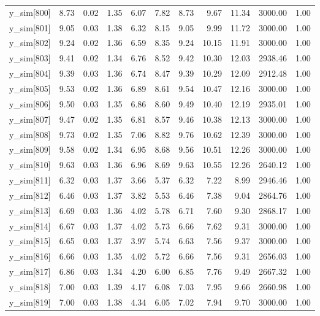 \begin{table}[ht]
\begin{tabular}{rrrrrrrrrrr}
  y\_sim[800] & 8.73 & 0.02 & 1.35 & 6.07 & 7.82 & 8.73 & 9.67 & 11.34 & 3000.00 & 1.00 \\ 
  y\_sim[801] & 9.05 & 0.03 & 1.38 & 6.32 & 8.15 & 9.05 & 9.99 & 11.72 & 3000.00 & 1.00 \\ 
  y\_sim[802] & 9.24 & 0.02 & 1.36 & 6.59 & 8.35 & 9.24 & 10.15 & 11.91 & 3000.00 & 1.00 \\ 
  y\_sim[803] & 9.41 & 0.02 & 1.34 & 6.76 & 8.52 & 9.42 & 10.30 & 12.03 & 2938.46 & 1.00 \\ 
  y\_sim[804] & 9.39 & 0.03 & 1.36 & 6.74 & 8.47 & 9.39 & 10.29 & 12.09 & 2912.48 & 1.00 \\ 
  y\_sim[805] & 9.53 & 0.02 & 1.36 & 6.89 & 8.61 & 9.54 & 10.47 & 12.16 & 3000.00 & 1.00 \\ 
  y\_sim[806] & 9.50 & 0.03 & 1.35 & 6.86 & 8.60 & 9.49 & 10.40 & 12.19 & 2935.01 & 1.00 \\ 
  y\_sim[807] & 9.47 & 0.02 & 1.35 & 6.81 & 8.57 & 9.46 & 10.38 & 12.13 & 3000.00 & 1.00 \\ 
  y\_sim[808] & 9.73 & 0.02 & 1.35 & 7.06 & 8.82 & 9.76 & 10.62 & 12.39 & 3000.00 & 1.00 \\ 
  y\_sim[809] & 9.58 & 0.02 & 1.34 & 6.95 & 8.68 & 9.56 & 10.51 & 12.26 & 3000.00 & 1.00 \\ 
  y\_sim[810] & 9.63 & 0.03 & 1.36 & 6.96 & 8.69 & 9.63 & 10.55 & 12.26 & 2640.12 & 1.00 \\ 
  y\_sim[811] & 6.32 & 0.03 & 1.37 & 3.66 & 5.37 & 6.32 & 7.22 & 8.99 & 2946.46 & 1.00 \\ 
  y\_sim[812] & 6.46 & 0.03 & 1.37 & 3.82 & 5.53 & 6.46 & 7.38 & 9.04 & 2864.76 & 1.00 \\ 
  y\_sim[813] & 6.69 & 0.03 & 1.36 & 4.02 & 5.78 & 6.71 & 7.60 & 9.30 & 2868.17 & 1.00 \\ 
  y\_sim[814] & 6.67 & 0.03 & 1.37 & 4.02 & 5.73 & 6.66 & 7.62 & 9.31 & 3000.00 & 1.00 \\ 
  y\_sim[815] & 6.65 & 0.03 & 1.37 & 3.97 & 5.74 & 6.63 & 7.56 & 9.37 & 3000.00 & 1.00 \\ 
  y\_sim[816] & 6.66 & 0.03 & 1.35 & 4.02 & 5.72 & 6.66 & 7.56 & 9.31 & 2656.03 & 1.00 \\ 
  y\_sim[817] & 6.86 & 0.03 & 1.34 & 4.20 & 6.00 & 6.85 & 7.76 & 9.49 & 2667.32 & 1.00 \\ 
  y\_sim[818] & 7.00 & 0.03 & 1.39 & 4.17 & 6.08 & 7.03 & 7.95 & 9.66 & 2660.98 & 1.00 \\ 
  y\_sim[819] & 7.00 & 0.03 & 1.38 & 4.34 & 6.05 & 7.02 & 7.94 & 9.70 & 3000.00 & 1.00 \\ 

\end{tabular}
\end{table}
